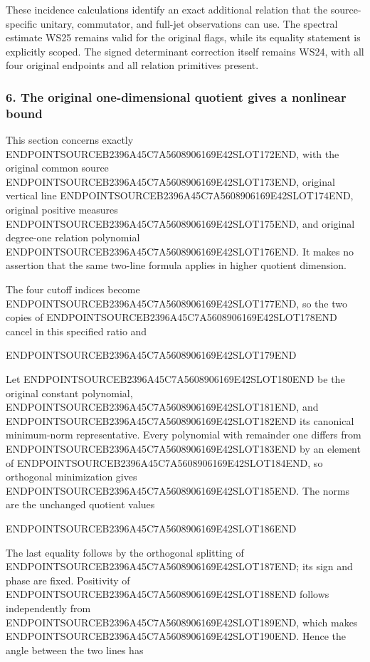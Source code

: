 These incidence calculations identify an exact additional relation that the source-specific unitary, commutator, and full-jet observations can use. The spectral estimate WS25 remains valid for the original flags, while its equality statement is explicitly scoped. The signed determinant correction itself remains WS24, with all four original endpoints and all relation primitives present.

\subsubsection{6. The original one-dimensional quotient gives a nonlinear bound}\label{endpoint-window_review--the-original-one-dimensional-quotient-gives-a-nonlinear-bound}

This section concerns exactly ENDPOINTSOURCEB2396A45C7A5608906169E42SLOT172END, with the original common source ENDPOINTSOURCEB2396A45C7A5608906169E42SLOT173END, original vertical line ENDPOINTSOURCEB2396A45C7A5608906169E42SLOT174END, original positive measures ENDPOINTSOURCEB2396A45C7A5608906169E42SLOT175END, and original degree-one relation polynomial ENDPOINTSOURCEB2396A45C7A5608906169E42SLOT176END. It makes no assertion that the same two-line formula applies in higher quotient dimension.

The four cutoff indices become ENDPOINTSOURCEB2396A45C7A5608906169E42SLOT177END, so the two copies of ENDPOINTSOURCEB2396A45C7A5608906169E42SLOT178END cancel in this specified ratio and

ENDPOINTSOURCEB2396A45C7A5608906169E42SLOT179END

Let ENDPOINTSOURCEB2396A45C7A5608906169E42SLOT180END be the original constant polynomial, ENDPOINTSOURCEB2396A45C7A5608906169E42SLOT181END, and ENDPOINTSOURCEB2396A45C7A5608906169E42SLOT182END its canonical minimum-norm representative. Every polynomial with remainder one differs from ENDPOINTSOURCEB2396A45C7A5608906169E42SLOT183END by an element of ENDPOINTSOURCEB2396A45C7A5608906169E42SLOT184END, so orthogonal minimization gives ENDPOINTSOURCEB2396A45C7A5608906169E42SLOT185END. The norms are the unchanged quotient values

ENDPOINTSOURCEB2396A45C7A5608906169E42SLOT186END

The last equality follows by the orthogonal splitting of ENDPOINTSOURCEB2396A45C7A5608906169E42SLOT187END; its sign and phase are fixed. Positivity of ENDPOINTSOURCEB2396A45C7A5608906169E42SLOT188END follows independently from ENDPOINTSOURCEB2396A45C7A5608906169E42SLOT189END, which makes ENDPOINTSOURCEB2396A45C7A5608906169E42SLOT190END. Hence the angle between the two lines has

